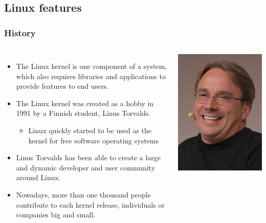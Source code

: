 \subsection{Linux features}

\begin{frame}
  \frametitle{History}
  \begin{columns}
    \begin{itemize}
    \item The Linux kernel is one component of a system, which also
      requires libraries and applications to provide features to end
      users.
    \item The Linux kernel was created as a hobby in 1991 by a Finnish
      student, Linus Torvalds.
      \begin{itemize}
      \item Linux quickly started to be used as the kernel for free
        software operating systems
      \end{itemize}
    \item Linus Torvalds has been able to create a large and dynamic
      developer and user community around Linux.
    \item Nowadays, more than one thousand people contribute to each kernel
      release, individuals or companies big and small.
    \end{itemize}
      \includegraphics[width=\textwidth]{slides/sysdev-linux-intro-features/linus-torvalds.jpg}

\end{columns}
\end{frame}
